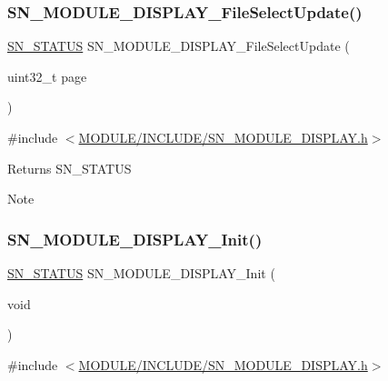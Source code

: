 \subsubsection{\texorpdfstring{S\+N\+\_\+\+M\+O\+D\+U\+L\+E\+\_\+\+D\+I\+S\+P\+L\+A\+Y\+\_\+\+File\+Select\+Update()}{SN\_MODULE\_DISPLAY\_FileSelectUpdate()}}
{\footnotesize\ttfamily \hyperlink{group__SYSTEM__ERROR_ga4540713b9a7a18ce44d78c3a10f7442f}{S\+N\+\_\+\+S\+T\+A\+T\+US} S\+N\+\_\+\+M\+O\+D\+U\+L\+E\+\_\+\+D\+I\+S\+P\+L\+A\+Y\+\_\+\+File\+Select\+Update (\begin{DoxyParamCaption}\item[{uint32\+\_\+t}]{page }\end{DoxyParamCaption})}



{\ttfamily \#include $<$\hyperlink{SN__MODULE__DISPLAY_8h}{M\+O\+D\+U\+L\+E/\+I\+N\+C\+L\+U\+D\+E/\+S\+N\+\_\+\+M\+O\+D\+U\+L\+E\+\_\+\+D\+I\+S\+P\+L\+A\+Y.\+h}$>$}

\begin{DoxyReturn}{Returns}
S\+N\+\_\+\+S\+T\+A\+T\+US 
\end{DoxyReturn}
\begin{DoxyNote}{Note}

\end{DoxyNote}
\mbox{\label{group__MODULE__DISPLAY_ga894da8d8618a3c3b5bf2533a3a04622c}} 
\subsubsection{\texorpdfstring{S\+N\+\_\+\+M\+O\+D\+U\+L\+E\+\_\+\+D\+I\+S\+P\+L\+A\+Y\+\_\+\+Init()}{SN\_MODULE\_DISPLAY\_Init()}}
{\footnotesize\ttfamily \hyperlink{group__SYSTEM__ERROR_ga4540713b9a7a18ce44d78c3a10f7442f}{S\+N\+\_\+\+S\+T\+A\+T\+US} S\+N\+\_\+\+M\+O\+D\+U\+L\+E\+\_\+\+D\+I\+S\+P\+L\+A\+Y\+\_\+\+Init (\begin{DoxyParamCaption}\item[{void}]{ }\end{DoxyParamCaption})}



{\ttfamily \#include $<$\hyperlink{SN__MODULE__DISPLAY_8h}{M\+O\+D\+U\+L\+E/\+I\+N\+C\+L\+U\+D\+E/\+S\+N\+\_\+\+M\+O\+D\+U\+L\+E\+\_\+\+D\+I\+S\+P\+L\+A\+Y.\+h}$>$}

